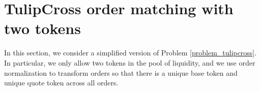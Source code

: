 \documentclass[11pt, reqno]{amsart}
\theoremstyle{definition}
\theoremstyle{remark}
\newcommand{\BTC}{\textnormal{\texttt{wBTC}}}
\newcommand{\ETH}{\textnormal{\texttt{ETH}}}
\newcommand{\limitprice}{\textnormal{\texttt{limit\_price}}}
\newcommand{\buy}{\textnormal{\texttt{buy}}}
\begin{document}
%
%
%
%
%
%
%
%
%
%
%

\section{TulipCross order matching with two tokens}

In this section, we consider a simplified version of Problem
\ref{problem_tulipcross}. In particular, we only allow two tokens in the pool
of liquidity, and we use order normalization to transform orders so that
there is a unique base token and unique quote token across all orders.

\end{document}
